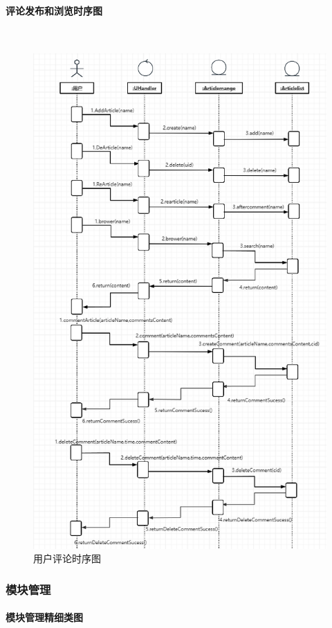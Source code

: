 \documentclass[UTF8]{ctexart}
\newcommand{\subsubsubsection}[1]{\paragraph{#1}\mbox{}\\} %
\begin{document}
\subsubsubsection{评论发布和浏览时序图}

\begin{figure}[H]
  \centering
  \includegraphics[scale=0.3]{顺序图/用户评论.png}
  \caption{用户评论时序图}
\end{figure}



\subsubsection{模块管理}

\subsubsubsection{模块管理精细类图}
\end{document}
